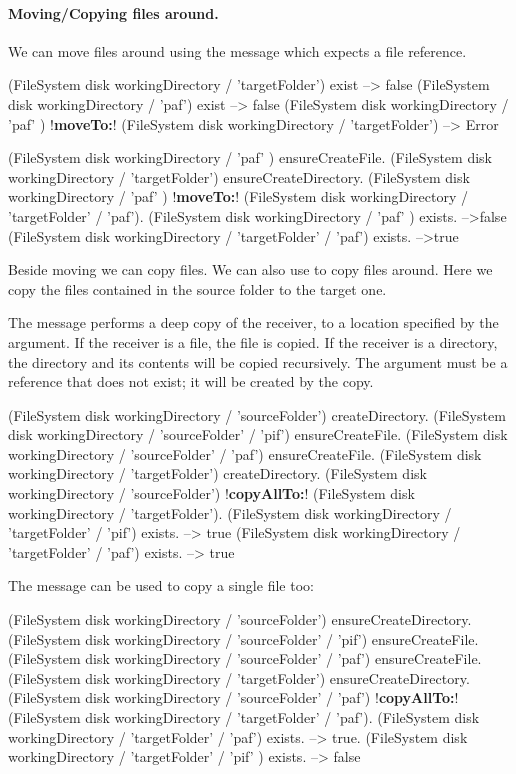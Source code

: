 \documentclass[a4paper,10pt,twoside]{book}
\begin{document}
\paragraph{Moving/Copying files around.}

We can move files around using the message  which expects a file reference. 
\begin{code}{}
(FileSystem disk workingDirectory / 'targetFolder') exist
  --> false
(FileSystem disk workingDirectory / 'paf') exist
  --> false
(FileSystem disk workingDirectory / 'paf' ) !\textbf{moveTo:}! (FileSystem disk workingDirectory / 'targetFolder')
 --> Error

(FileSystem disk workingDirectory / 'paf' ) ensureCreateFile.
(FileSystem disk workingDirectory / 'targetFolder') ensureCreateDirectory. 
(FileSystem disk workingDirectory / 'paf' ) !\textbf{moveTo:}! (FileSystem disk workingDirectory / 'targetFolder' / 'paf').
(FileSystem disk workingDirectory / 'paf' ) exists.
	-->false
(FileSystem disk workingDirectory / 'targetFolder' / 'paf') exists.
	-->true
\end{code}

Beside moving we can copy files. 
We can also use  to copy files around. Here we copy the files contained in the source folder to the target one. 

The message  performs a deep copy of the receiver, to a location specified by the argument. If the receiver is a file, the file is copied. If the receiver is a directory, the directory and its contents will be copied recursively. The argument must be a reference that does not exist; it will be created by the copy.

\begin{code}{}
(FileSystem disk workingDirectory / 'sourceFolder') createDirectory. 
(FileSystem disk workingDirectory / 'sourceFolder' / 'pif') ensureCreateFile.
(FileSystem disk workingDirectory / 'sourceFolder' / 'paf') ensureCreateFile.
(FileSystem disk workingDirectory / 'targetFolder') createDirectory. 
(FileSystem disk workingDirectory / 'sourceFolder') !\textbf{copyAllTo:}! (FileSystem disk workingDirectory / 'targetFolder').
(FileSystem disk workingDirectory / 'targetFolder' / 'pif') exists.
  --> true
(FileSystem disk workingDirectory / 'targetFolder' / 'paf') exists.
 --> true
 \end{code}


The message  can be used to copy a single file too:

\begin{code}{}
(FileSystem disk workingDirectory / 'sourceFolder') ensureCreateDirectory. 
(FileSystem disk workingDirectory /  'sourceFolder' / 'pif') ensureCreateFile.
(FileSystem disk workingDirectory /  'sourceFolder' / 'paf') ensureCreateFile.
(FileSystem disk workingDirectory / 'targetFolder') ensureCreateDirectory. 
(FileSystem disk workingDirectory / 'sourceFolder' / 'paf') !\textbf{copyAllTo:}! (FileSystem disk workingDirectory / 'targetFolder' / 'paf').
(FileSystem disk workingDirectory /  'targetFolder' / 'paf') exists.
	--> true.
(FileSystem disk workingDirectory /  'targetFolder' / 'pif' ) exists.
  --> false
\end{code}
\end{document}

